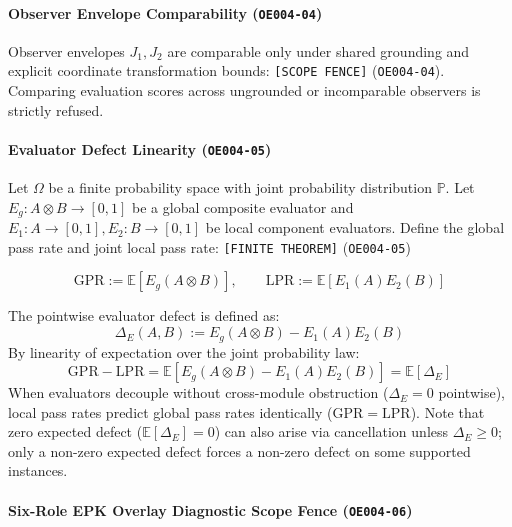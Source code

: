 \documentclass[
  11pt,
]{article}
\renewcommand{\_}{\origunderscore\allowbreak}
\begin{document}
\paragraph{\texorpdfstring{Observer Envelope Comparability
(\texttt{OE004-04})}{Observer Envelope Comparability (OE004-04)}}\label{observer-envelope-comparability-oe004-04}

Observer envelopes \(J_1, J_2\) are comparable only under shared
grounding and explicit coordinate transformation bounds:
\texttt{{[}SCOPE\ FENCE{]}} (\texttt{OE004-04}). Comparing evaluation
scores across ungrounded or incomparable observers is strictly refused.

\paragraph{\texorpdfstring{Evaluator Defect Linearity
(\texttt{OE004-05})}{Evaluator Defect Linearity (OE004-05)}}\label{evaluator-defect-linearity-oe004-05}

Let \(\Omega\) be a finite probability space with joint probability
distribution \(\mathbb{P}\). Let \(E_g: A \otimes B \to [0, 1]\) be a
global composite evaluator and \(E_1: A \to [0, 1], E_2: B \to [0, 1]\)
be local component evaluators. Define the global pass rate and joint
local pass rate: \texttt{{[}FINITE\ THEOREM{]}} (\texttt{OE004-05})

\[\mathrm{GPR} := \mathbb{E}[E_g(A \otimes B)], \qquad \mathrm{LPR} := \mathbb{E}[E_1(A) E_2(B)]\]

The pointwise evaluator defect is defined as:
\[\Delta_E(A, B) := E_g(A \otimes B) - E_1(A) E_2(B)\] By linearity of
expectation over the joint probability law:
\[\mathrm{GPR} - \mathrm{LPR} = \mathbb{E}[E_g(A \otimes B) - E_1(A) E_2(B)] = \mathbb{E}[\Delta_E]\]
When evaluators decouple without cross-module obstruction
(\(\Delta_E = 0\) pointwise), local pass rates predict global pass rates
identically (\(\mathrm{GPR} = \mathrm{LPR}\)). Note that zero expected
defect (\(\mathbb{E}[\Delta_E] = 0\)) can also arise via cancellation
unless \(\Delta_E \ge 0\); only a non-zero expected defect forces a
non-zero defect on some supported instances.

\paragraph{\texorpdfstring{Six-Role EPK Overlay Diagnostic Scope Fence
(\texttt{OE004-06})}{Six-Role EPK Overlay Diagnostic Scope Fence (OE004-06)}}\label{six-role-epk-overlay-diagnostic-scope-fence-oe004-06}
\end{document}

